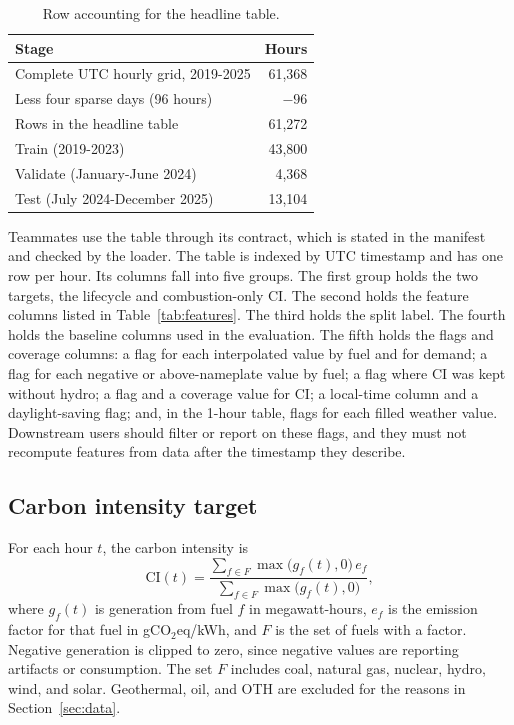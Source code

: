 \documentclass[10pt,journal,compsoc]{IEEEtran}
\begin{document}
\begin{table}[t]
\caption{Row accounting for the headline table.}
\label{tab:rows}
\centering
\small
\begin{tabular}{@{}lr@{}}
\toprule
Stage & Hours \\
\midrule
Complete UTC hourly grid, 2019-2025 & 61,368 \\
Less four sparse days (96 hours) & $-96$ \\
Rows in the headline table & 61,272 \\
\quad Train (2019-2023) & 43,800 \\
\quad Validate (January-June 2024) & 4,368 \\
\quad Test (July 2024-December 2025) & 13,104 \\
\bottomrule
\end{tabular}
\end{table}

Teammates use the table through its contract, which is stated in the manifest and checked by the loader. The table is indexed by UTC timestamp and has one row per hour. Its columns fall into five groups. The first group holds the two targets, the lifecycle and combustion-only CI. The second holds the feature columns listed in Table~\ref{tab:features}. The third holds the split label. The fourth holds the baseline columns used in the evaluation. The fifth holds the flags and coverage columns: a flag for each interpolated value by fuel and for demand; a flag for each negative or above-nameplate value by fuel; a flag where CI was kept without hydro; a flag and a coverage value for CI; a local-time column and a daylight-saving flag; and, in the 1-hour table, flags for each filled weather value. Downstream users should filter or report on these flags, and they must not recompute features from data after the timestamp they describe.

\subsection{Carbon intensity target}
For each hour $t$, the carbon intensity is
\begin{equation}
\mathrm{CI}(t) = \frac{\sum_{f \in F} \max\bigl(g_f(t), 0\bigr)\, e_f}{\sum_{f \in F} \max\bigl(g_f(t), 0\bigr)},
\end{equation}
where $g_f(t)$ is generation from fuel $f$ in megawatt-hours, $e_f$ is the emission factor for that fuel in gCO$_2$eq/kWh, and $F$ is the set of fuels with a factor. Negative generation is clipped to zero, since negative values are reporting artifacts or consumption. The set $F$ includes coal, natural gas, nuclear, hydro, wind, and solar. Geothermal, oil, and OTH are excluded for the reasons in Section~\ref{sec:data}.
\end{document}
